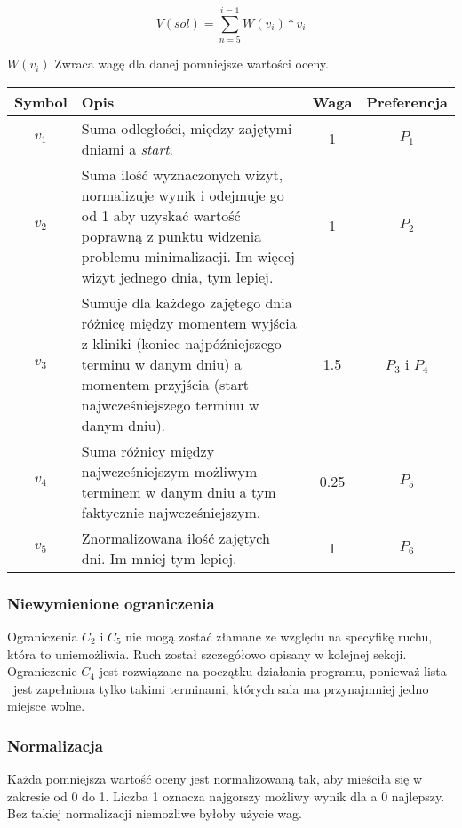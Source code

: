 \begin{equation}
	V(sol) = \sum_{n=5}^{i=1} W(v_i) * v_i
\end{equation}

$W(v_i)$  Zwraca wagę dla danej pomniejsze wartości oceny.
\begin{table}[h]
	\begin{tabularx}{\textwidth}{ | C{0.4} | L{2.6} | C{0.3} | C{0.7} | }
		\hline
		\bfseries Symbol & \bfseries Opis & \bfseries Waga & \bfseries
		Preferencja \\
		\hline
		$v_1$ & Suma odległości, między zajętymi dniami a \emph{start}.&
		1 & $P_1$\\
		\hline
		$v_2$ & Suma ilość wyznaczonych
		wizyt, normalizuje wynik i odejmuje go od 1 aby uzyskać wartość
		poprawną z punktu widzenia problemu minimalizacji. Im więcej
		wizyt jednego dnia, tym lepiej. & 1 &
		$P_2$\\
		\hline
		$v_3$ & Sumuje dla każdego zajętego dnia różnicę między momentem wyjścia z
		kliniki (koniec najpóźniejszego terminu w danym dniu) a momentem
		przyjścia (start najwcześniejszego terminu w danym
		dniu). & 1.5 & $P_3$ i $P_4$ \\
		\hline
		$v_4$ & Suma różnicy między
		najwcześniejszym możliwym terminem w danym dniu a tym faktycznie
		najwcześniejszym. & 0.25 & $P_5$\\
		\hline
		$v_5$ & Znormalizowana ilość zajętych dni. Im mniej tym lepiej. & 1 & $P_6$\\
		\hline
\end{tabularx}
\end{table}


\subsubsection{Niewymienione ograniczenia}
Ograniczenia $C_2$ i $C_5$ nie mogą zostać złamane ze względu na specyfikę
ruchu, która to uniemożliwia. Ruch został szczegółowo opisany w kolejnej sekcji.
Ograniczenie $C_4$ jest rozwiązane na początku działania programu, ponieważ
lista \sTermsList\ jest zapełniona tylko takimi terminami, których sala ma
przynajmniej jedno miejsce wolne.

\subsubsection{Normalizacja} 
Każda pomniejsza wartość oceny jest normalizowaną tak, aby mieściła się w
zakresie od 0 do 1. Liczba 1 oznacza najgorszy możliwy wynik dla a 0 najlepszy.
Bez takiej normalizacji niemożliwe byłoby użycie wag.

